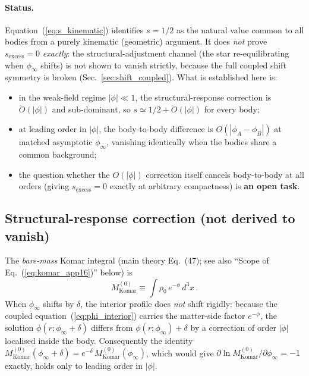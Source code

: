 \documentclass[11pt]{article}
\begin{document}
\paragraph{Status.}  Equation~(\ref{eq:s_kinematic})
identifies $s=1/2$ as the natural value common to all
bodies from a purely kinematic (geometric) argument.  It
does \emph{not} prove $s_{\mathrm{excess}} = 0$
\emph{exactly}: the structural-adjustment channel (the
star re-equilibrating when $\phi_\infty$ shifts) is not
shown to vanish strictly, because the full coupled shift
symmetry is broken (Sec.~\ref{sec:shift_coupled}).  What
is established here is:
\begin{itemize}
\item in the weak-field regime $|\phi| \ll 1$, the
  structural-response correction is $O(|\phi|)$ and
  sub-dominant, so $s \simeq 1/2 + O(|\phi|)$ for every
  body;
\item at leading order in $|\phi|$, the body-to-body
  difference is $O(|\phi_A - \phi_B|)$ at matched
  asymptotic $\phi_\infty$, vanishing identically when
  the bodies share a common background;
\item the question whether the $O(|\phi|)$ correction
  itself cancels body-to-body at all orders
  (giving $s_{\mathrm{excess}} = 0$ exactly at arbitrary
  compactness) is \textbf{an open task}.
\end{itemize}

\subsection{Structural-response correction (not derived
to vanish)}

The \emph{bare-mass} Komar integral (main theory
Eq.~(47); see also ``Scope of Eq.~(\ref{eq:komar_app16})''
below) is
\begin{equation}\label{eq:komar_app16}
  M_{\mathrm{Komar}}^{(0)} \equiv
  \int \rho_0\,e^{-\phi}\,d^3x\,.
\end{equation}
When $\phi_\infty$ shifts by $\delta$, the interior
profile does \emph{not} shift rigidly: because the
coupled equation~(\ref{eq:phi_interior}) carries the
matter-side factor $e^{-\phi}$, the solution
$\phi(r;\phi_\infty+\delta)$ differs from
$\phi(r;\phi_\infty) + \delta$ by a correction of order
$|\phi|$ localised inside the body.  Consequently the
identity $M_{\mathrm{Komar}}^{(0)}(\phi_\infty+\delta) =
e^{-\delta}\,M_{\mathrm{Komar}}^{(0)}(\phi_\infty)$, which
would give $\partial\ln M_{\mathrm{Komar}}^{(0)}/\partial
\phi_\infty = -1$ exactly, holds only to leading order
in $|\phi|$.
\end{document}
